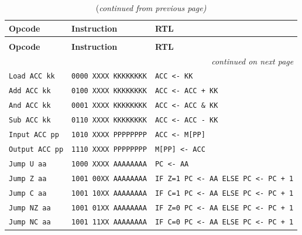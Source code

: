 \documentclass[11pt]{article}
\begin{document}
\begin{longtable}{|l|l|l|}
  \caption{Instruction Set of the Simple CPU}\\ \hline
          {\bf Opcode} & {\bf Instruction} & {\bf RTL} \\ 
          \endfirsthead
          \caption[]{(\em continued from previous page)}\\
          \hline
              {\bf Opcode} & {\bf Instruction} & {\bf RTL} \\ \hline 
              \endhead
              \multicolumn{3}{|r|}{{\em continued on next page}} \\ \hline
              \endfoot
              \endlastfoot
              \hline \hline
              \texttt{Load ACC kk} &  \texttt{0000 XXXX KKKKKKKK} & \texttt{ACC <- KK} \\ \hline
              
              \texttt{Add ACC kk} &  \texttt{0100 XXXX KKKKKKKK} & \texttt{ACC <- ACC + KK} \\ \hline
              
              \texttt{And ACC kk} &  \texttt{0001 XXXX KKKKKKKK} &  \texttt{ACC <- ACC \& KK} \\ \hline
              
              \texttt{Sub ACC kk} &  \texttt{0110 XXXX KKKKKKKK} & \texttt{ACC <- ACC - KK} \\ \hline
              
              \texttt{Input ACC pp} &  \texttt{1010 XXXX PPPPPPPP} & \texttt{ACC <- M[PP]} \\ \hline
              
              \texttt{Output ACC pp} &  \texttt{1110 XXXX PPPPPPPP} & \texttt{M[PP] <- ACC} \\ \hline
              
              \texttt{Jump U aa} &  \texttt{1000 XXXX AAAAAAAA} & \texttt{PC <- AA} \\ \hline
              
              \texttt{Jump Z aa} &  \texttt{1001 00XX AAAAAAAA} & \texttt{IF Z=1 PC <- AA ELSE PC <- PC + 1} \\ \hline
              
              \texttt{Jump C aa} &  \texttt{1001 10XX AAAAAAAA} & \texttt{IF C=1 PC <- AA ELSE PC <- PC + 1} \\ \hline
              
              \texttt{Jump NZ aa} &  \texttt{1001 01XX AAAAAAAA} & \texttt{IF Z=0 PC <- AA ELSE PC <- PC + 1} \\ \hline
              
              \texttt{Jump NC aa} &  \texttt{1001 11XX AAAAAAAA} & \texttt{IF C=0 PC <- AA ELSE PC <- PC + 1}\\ \hline
              
\end{longtable}
\end{document}
